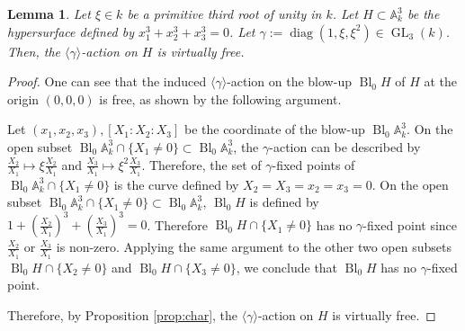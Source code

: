\documentclass[a4paper,11pt]{amsart}
\newtheorem{lem}[thm]{Lemma}
\theoremstyle{definition}
\theoremstyle{remark}
\begin{document}
\begin{lem}\label{lem:H}
Let $\xi \in k$ be a primitive third root of unity in $k$. 
Let $H \subset \mathbb{A}_k ^3$ be the hypersurface defined by $x_1 ^3 + x_2 ^3 + x_3 ^3 = 0$. 
Let $\gamma := \operatorname{diag}(1, \xi , \xi ^2) \in \operatorname{GL}_3(k)$. 
Then, the $\langle \gamma \rangle$-action on $H$ is virtually free.
\end{lem}
\begin{proof}
One can see that the induced $\langle \gamma \rangle$-action on the blow-up $\operatorname{Bl}_0 H$ of $H$ at the origin $(0,0,0)$ is free, as shown by the following argument. 

Let $(x_1, x_2 , x_3), [X_1:X_2:X_3]$ be the coordinate of the blow-up $\operatorname{Bl}_0\mathbb{A}_k ^3$. 
On the open subset $\operatorname{Bl}_0\mathbb{A}_k ^3 \cap \{ X_1 \not = 0 \} \subset \operatorname{Bl}_0\mathbb{A}_k ^3$, 
the $\gamma$-action can be described by 
$\frac{X_2}{X_1} \mapsto \xi \frac{X_2}{X_1}$ and $\frac{X_3}{X_1} \mapsto \xi ^2 \frac{X_3}{X_1}$. 
Therefore, the set of $\gamma$-fixed points of $\operatorname{Bl}_0\mathbb{A}_k ^3 \cap \{ X_1 \not = 0 \}$ 
is the curve defined by $X_2  = X_3 = x_2 = x_3 = 0$. 
On the open subset $\operatorname{Bl}_0\mathbb{A}_k ^3 \cap \{ X_1 \not = 0 \} \subset \operatorname{Bl}_0\mathbb{A}_k ^3$, 
$\operatorname{Bl}_0 H$ is defined by $1 + \left( \frac{X_2}{X_1} \right)^3 + \left( \frac{X_3}{X_1} \right)^3 = 0$. 
Therefore $\operatorname{Bl}_0 H \cap \{ X_1 \not = 0 \}$ has no $\gamma$-fixed point since $\frac{X_2}{X_1}$ or $\frac{X_3}{X_1}$ is non-zero. 
Applying the same argument to the other two open subsets $\operatorname{Bl}_0 H \cap \{ X_2 \not = 0 \}$ and $\operatorname{Bl}_0 H \cap \{ X_3 \not = 0 \}$,
we conclude that $\operatorname{Bl}_0 H$ has no $\gamma$-fixed point. 

Therefore, by Proposition \ref{prop:char}, the $\langle \gamma \rangle$-action on $H$ is virtually free. 
\end{proof}
\end{document}
